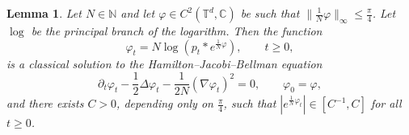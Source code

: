 \documentclass[a4paper,12pt]{article}
\newtheorem{lemma}[theorem]{Lemma}
\newcommand{\T}{\mathbb{T}}
\newcommand{\C}{\mathbb{C}}
\newcommand{\N}{\mathbb{N}}
\begin{document}
\begin{lemma}\label{lem:Cole-Hopf}
    Let $N \in \N$ and let $\varphi \in C^2(\T^d,\C)$ be such that $\|\tfrac1N \varphi\|_\infty \leq \tfrac\pi4$. Let $\log$ be the principal branch of the logarithm. Then the function
    \begin{equation}\label{eq:Cole-Hopf}
       \varphi_t = N \log \left( p_t \ast e^{\frac{1}{N} \varphi} \right) ,\qquad t \geq 0,
    \end{equation}
    is a classical solution to the Hamilton--Jacobi--Bellman equation
    \begin{equation}\label{eq:HJB}
       \partial_t \varphi_t - \frac{1}{2} \Delta \varphi_t - \frac{1}{2 N} (\nabla
   \varphi_t)^2 = 0,\qquad \varphi_0 = \varphi,
    \end{equation}
    and there exists $C>0$, depending only on $\tfrac\pi4$, such that $|e^{\frac1N \varphi_t}|\in \left[C^{-1},C\right]$ for all $t \geq 0$.
\end{lemma}
\end{document}
